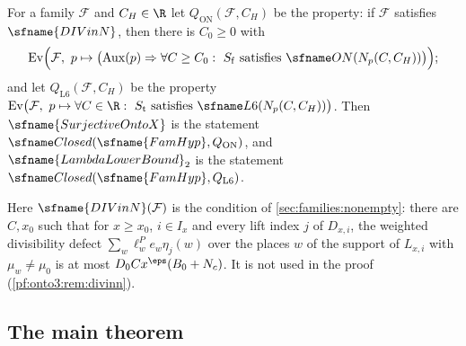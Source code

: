 \begin{definition}\label{pf:onto3:stmts}
For a family $\mathcal F$ and $C_H\in\R$ let $Q_{\mathrm{ON}}(\mathcal F,C_H)$ be the property: if $\mathcal F$
satisfies $\sfname{DIVinN}$, then there is $C_0\ge0$ with
\[
\ontothreeEv\Bigl(\mathcal F,\ p\mapsto\bigl(\ontothreeMore(p)\Rightarrow\forall C\ge C_0:\
S_{\mathrm f}\text{ satisfies }\ontothreeON(N_p(C,C_H))\bigr)\Bigr);
\]
and let $Q_{\mathrm{L6}}(\mathcal F,C_H)$ be the property $\ontothreeEv\bigl(\mathcal F,\ p\mapsto\forall C\in\R:\
S_{\mathrm t}\text{ satisfies }\ontothreeLsix(N_p(C,C_H))\bigr)$. Then $\sfname{SurjectiveOntoX}$ is the statement
$\ontothreeClosed(\sfname{FamHyp},Q_{\mathrm{ON}})$, and $\sfname{LambdaLowerBound}_2$ is the statement
$\ontothreeClosed(\sfname{FamHyp},Q_{\mathrm{L6}})$.
\end{definition}

Here $\sfname{DIVinN}(\mathcal F)$ is the condition of \cref{sec:families:nonempty}: there are $C,x_0$ such that
for $x\ge x_0$, $i\in I_x$ and every lift index $j$ of $D_{x,i}$, the weighted divisibility defect
$\sum_w\ell^{P}_w e_w\eta_j(w)$ over the places $w$ of the support of $L_{x,i}$ with $\mu_w\ne\mu_0$ is at most
$D_0Cx^{\eps}(B_0+N_c)$. It is not used in the proof (\cref{pf:onto3:rem:divinn}).

\subsection{The main theorem}\label{sec:pf:onto3:main}

